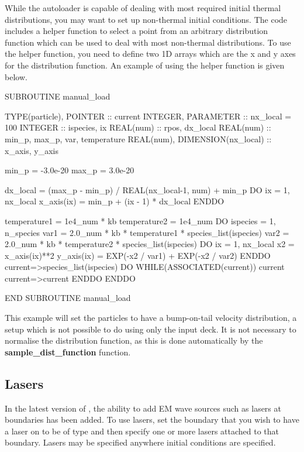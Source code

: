 While the autoloader is capable of dealing with most required initial thermal
distributions, you may want to set up non-thermal initial conditions. The code
includes a helper function to select a point from an arbitrary distribution
function which can be used to deal with most non-thermal distributions. To use
the helper function, you need to define two 1D arrays which are the x and
y axes for the distribution function. An example of using the helper function
is given below.
\begin{boxverbatim}
SUBROUTINE manual_load

  TYPE(particle), POINTER :: current
  INTEGER, PARAMETER :: nx_local = 100
  INTEGER :: ispecies, ix
  REAL(num) :: rpos, dx_local
  REAL(num) :: min_p, max_p, var, temperature
  REAL(num), DIMENSION(nx_local) :: x_axis, y_axis

  min_p = -3.0e-20
  max_p = 3.0e-20

  dx_local = (max_p - min_p) / REAL(nx_local-1, num) + min_p
  DO ix = 1, nx_local
    x_axis(ix) = min_p + (ix - 1) * dx_local
  ENDDO

  temperature1 = 1e4_num * kb
  temperature2 = 1e4_num
  DO ispecies = 1, n_species
    var1 = 2.0_num * kb * temperature1 * species_list(ispecies)%
    var2 = 2.0_num * kb * temperature2 * species_list(ispecies)%
    DO ix = 1, nx_local
      x2 = x_axis(ix)**2
      y_axis(ix) = EXP(-x2 / var1) + EXP(-x2 / var2)
    ENDDO
    current=>species_list(ispecies)%
    DO WHILE(ASSOCIATED(current))
      current%
      current=>current%
    ENDDO
  ENDDO

END SUBROUTINE manual_load
\end{boxverbatim}

This example will set the particles to have a bump-on-tail velocity
distribution, a setup which is not possible to do using only the
input deck. It is not necessary to normalise
the distribution function, as this is done automatically by the
{\bf sample\_dist\_function} function.


\subsection{Lasers}
In the latest version of {\EPOCH}, the ability to add EM wave sources such as
lasers at boundaries has been added. To use lasers, set the boundary that you
wish to have a laser on to be of type  and then
specify one or more lasers attached to that boundary. Lasers may be specified
anywhere initial conditions are specified.

